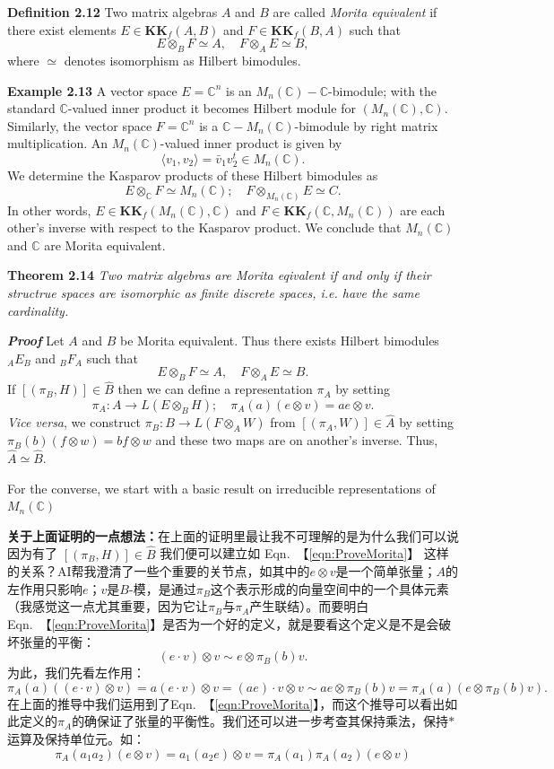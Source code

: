 \textbf{Definition 2.12} Two matrix algebras $A$ and $B$ are called \textit{Morita equivalent} if there exist elements $E\in\mathbf{KK}_f(A,B)$ and $F\in \mathbf{KK}_f(B,A)$ such that 
\[E\otimes_BF\simeq A, \quad F\otimes_AE\simeq B,\]
where $\simeq$ denotes isomorphism as Hilbert bimodules.

\textbf{Example 2.13} A vector space $E=\mathbb{C}^n$ is an $M_n(\mathbb{C})-\mathbb{C}$-bimodule; with the standard $\mathbb{C}$-valued inner product it becomes  Hilbert module for $(M_n(\mathbb{C}),\mathbb{C})$. Similarly, the vector space $F=\mathbb{C}^n$ is a $\mathbb{C}-M_n(\mathbb{C})$-bimodule by right matrix multiplication. An $M_n(\mathbb{C})$-valued inner product is given by
\[\langle v_1,v_2\rangle=\bar{v}_1v^t_2\in M_n(\mathbb{C}).\]
We determine the Kasparov products of these Hilbert bimodules as 
\[E\otimes_{\mathbb{C}}F\simeq M_n(\mathbb{C});\quad F\otimes_{M_n(\mathbb{C})}E\simeq C.\]
In other words, $E\in\mathbf{KK}_f(M_n(\mathbb{C}),\mathbb{C})$ and $F\in\mathbf{KK}_f(\mathbb{C},M_n(\mathbb{C}))$ are each other's inverse with respect to the Kasparov product. We conclude that $M_n(\mathbb{C})$ and $\mathbb{C}$ are Morita equivalent.

\textbf{Theorem 2.14} \textit{Two matrix algebras are Morita eqivalent if and only if their structrue spaces are isomorphic as finite discrete spaces, i.e. have the same cardinality.}

\textbf{\textit{Proof}} Let $A$ and $B$ be Morita equivalent. Thus there exists Hilbert bimodules $_AE_B$ and $_BF_A$ such that 
\[E\otimes_BF\simeq A, \quad F\otimes_AE\simeq B.\]
If $[(\pi_B,H)]\in\hat{B}$ then we can define a representation $\pi_A$ by setting
\begin{equation}
    \pi_A:A\rightarrow L(E\otimes_BH); \quad \pi_A(a)(e\otimes v)=ae\otimes v.
    \label{eqn:ProveMorita}
\end{equation}
\textit{Vice versa}, we construct $\pi_B:B\rightarrow L(F\otimes_A W)$ from $[(\pi_A, W)]\in \hat{A}$ by setting $\pi_B(b)(f\otimes w)=bf\otimes w$ and these two maps are on another's inverse. Thus, $\hat{A}\simeq\hat{B}$. 

For the converse, we start with a basic result on irreducible representations of $M_n(\mathbb{C})$

\textbf{关于上面证明的一点想法：}在上面的证明里最让我不可理解的是为什么我们可以说因为有了 $[(\pi_B,H)]\in\hat{B}$ 我们便可以建立如 Eqn.~【\ref{eqn:ProveMorita}】 这样的关系？AI帮我澄清了一些个重要的关节点，如其中的$e\otimes v$是一个简单张量；$A$的左作用只影响$e$；$v$是$B$-模，是通过$\pi_B$这个表示形成的向量空间中的一个具体元素（我感觉这一点尤其重要，因为它让$\pi_B$与$\pi_A$产生联结）。而要明白Eqn.~【\ref{eqn:ProveMorita}】是否为一个好的定义，就是要看这个定义是不是会破坏张量的平衡：
\[
(e\cdot v)\otimes v\sim e\otimes \pi_B(b)v.
\]
为此，我们先看左作用：
\[
\pi_A(a)((e\cdot v)\otimes v)=a(e\cdot v)\otimes v=(ae)\cdot v\otimes v\sim ae\otimes \pi_B(b)v = \pi_A(a)(e\otimes \pi_B(b)v).
\]
在上面的推导中我们运用到了Eqn.~【\ref{eqn:ProveMorita}】，而这个推导可以看出如此定义的$\pi_A$的确保证了张量的平衡性。我们还可以进一步考查其保持乘法，保持$*$运算及保持单位元。如：
\[
\pi_A(a_1a_2)(e\otimes v)=a_1(a_2e)\otimes v=\pi_A(a_1)\pi_A(a_2)(e\otimes v)
\]


